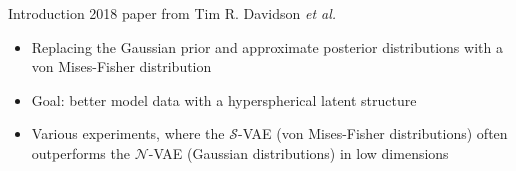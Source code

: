 \begin{frame}{Introduction}
    2018 paper from Tim R. Davidson \emph{et al.} \cite{davidson_hyperspherical_2022}
    \begin{itemize}
        \item Replacing the Gaussian prior and approximate posterior distributions with a von Mises-Fisher distribution
        \item Goal: better model data with a hyperspherical latent structure
        \item Various experiments, where the $\mathcal{S}$-VAE (von Mises-Fisher distributions) often outperforms the
        $\mathcal{N}$-VAE (Gaussian distributions) in low dimensions
    \end{itemize}
\end{frame}
